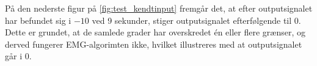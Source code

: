På den nederste figur på \autoref{fig:test_kendtinput} fremgår det, at efter outputsignalet har befundet sig i $-10$ ved 9 sekunder, stiger outputsignalet efterfølgende til $0$. Dette er grundet, at de samlede grader har overskredet én eller flere grænser, og derved fungerer EMG-algorimten ikke, hvilket illustreres med at outputsignalet går i $0$.
